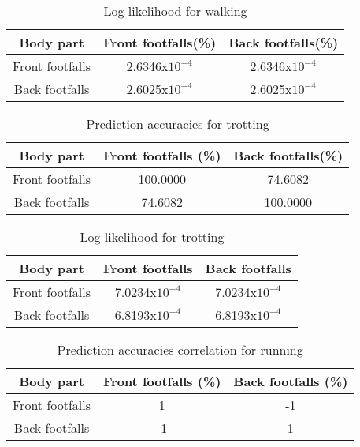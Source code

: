 \begin{table}[h!] 
	\centering
	\begin{tabular}{ |c|c|c|} 	
		\hline	
		\textbf{Body part} & \textbf{Front footfalls(\%)} &  \textbf{Back footfalls(\%)}\\ 
		\hline
		Front footfalls & 2.6346x\(10^{-4}\) & 2.6346x\(10^{-4}\)\\ 
		\hline
		Back footfalls & 2.6025x\(10^{-4}\) & 2.6025x\(10^{-4}\)\\ 
		\hline	   	
	\end{tabular}
	\caption{Log-likelihood for walking}
	\label{tab:front-back-walk-log}
\end{table}


\begin{table}[h!] 
	\centering
	\begin{tabular}{ |c|c|c|} 	
		\hline	
		\textbf{Body part} & \textbf{Front footfalls (\%)} &  \textbf{Back footfalls(\%)}\\ 
		\hline
		Front footfalls &  100.0000 & 74.6082\\ 
		\hline
		Back footfalls & 74.6082 & 100.0000 \\ 
		\hline	   	
	\end{tabular}
	\caption{Prediction accuracies for trotting}
	\label{tab:front-back-trot-acc}
\end{table}


\begin{table}[h!] 
	\centering
	\begin{tabular}{ |c|c|c|} 	
		\hline	
		\textbf{Body part} & \textbf{Front footfalls} &  \textbf{Back footfalls}\\ 
		\hline
		Front footfalls & 7.0234x\(10^{-4}\) & 7.0234x\(10^{-4}\)\\ 
		\hline
		Back footfalls & 6.8193x\(10^{-4}\) & 6.8193x\(10^{-4}\)\\ 
		\hline	   	
	\end{tabular}
	\caption{Log-likelihood for trotting}
	\label{tab:front-back-trot-log}
\end{table}

\begin{table}[h!] 
	\centering
	\begin{tabular}{ |c|c|c|} 	
		\hline	
		\textbf{Body part} & \textbf{Front footfalls (\%)} &  \textbf{Back footfalls (\%)}\\ 
		\hline
		Front footfalls & 1 & -1\\ 
		\hline
		Back footfalls & -1 & 1 \\ 
		\hline	   	
	\end{tabular}
	\caption{Prediction accuracies correlation for running}
	\label{tab:front-back-run-acc-corr}
\end{table}

